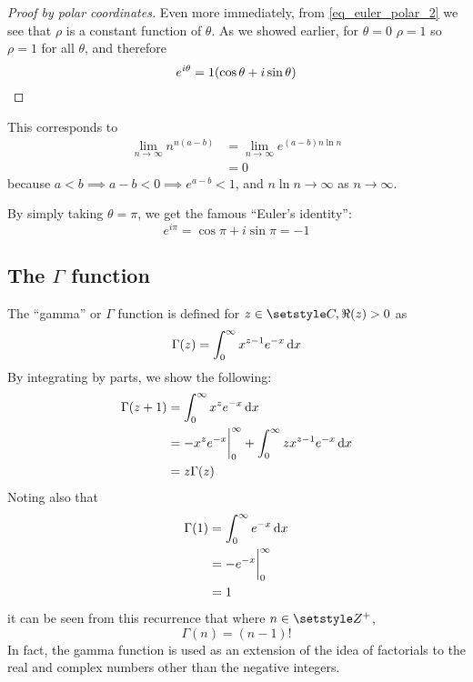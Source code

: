 \begin{proof}[Proof by polar coordinates]
 Even more immediately, from \ref{eq_euler_polar_2} we see that \(\rho\) is a
 constant function of \(\theta\). As we showed earlier, for \(\theta = 0\)
 \(\rho = 1\) so \(\rho = 1\) for all \(\theta\), and therefore
 \begin{equation*}
  e^{i \theta} = 1 (\cos \theta + i \sin \theta) \qedhere
 \end{equation*}
\end{proof}

\begin{lemma}
 \label{lem_nn_exp_limit}
 This corresponds to
 \begin{align*}
  \lim_{n \to \infty} n^{n(a - b)}
   &= \lim_{n \to \infty} e^{(a - b)n \ln n} \\
   &= 0
 \end{align*}
 because \(a < b \implies a - b < 0 \implies e^{a - b} < 1\), and
 \(n \ln n \to \infty\) as \(n \to \infty\).
\end{lemma}

\begin{corollary}
 By simply taking \(\theta = \pi\), we get the famous ``Euler's identity'':
 \begin{equation*}
  e^{i \pi} = \cos \pi + i \sin \pi = -1
 \end{equation*}
\end{corollary}

\subsection[The \texorpdfstring{\(\Gamma\)}{Gamma} function]
           {The \boldmath\(\Gamma\) function}

The ``gamma'' or \(\Gamma\) function is defined for
\(z \in \Complex, \Re(z) > 0\) as
\begin{equation}
 \Gamma(z) = \integ[0]<\infty>{x^{z - 1}e^{-x}}{x}
\end{equation}
By integrating by parts, we show the following:
\begin{align*}
 \Gamma(z + 1) &= \integ[0]<\infty>{x^z e^{-x}}{x} \\
           &= -x^z e^{-x}\eval_0^\infty
              + \integ[0]<\infty>{zx^{z - 1}e^{-x}}{x} \\
           &= z\Gamma(z)
\end{align*}
Noting also that
\begin{align*}
 \Gamma(1) &= \integ[0]<\infty>{e^{-x}}{x} \\
       &= -e^{-x}\eval_0^\infty \\
       &= 1
\end{align*}
it can be seen from this recurrence that where \(n \in \Integers^+\),
\begin{equation}
 \Gamma(n) = (n - 1)!
\end{equation}
In fact, the gamma function is used as an extension of the idea of
factorials to the real and complex numbers other than the negative integers.

